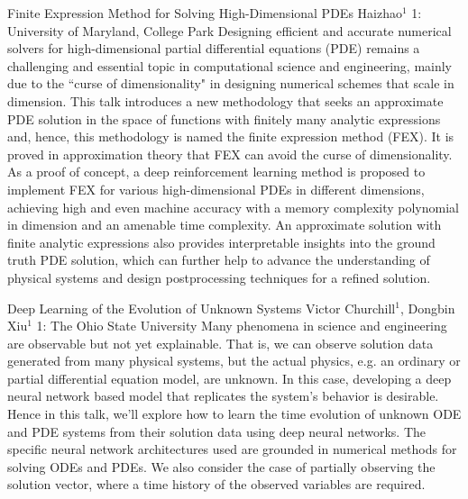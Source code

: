 \begin{addmargin}[2em]{0em}
\vspace{2ex}
\abs
{Finite Expression Method for Solving High-Dimensional PDEs}
{Haizhao$^{1}$}
{1: University of Maryland, College Park}
{Designing efficient and accurate numerical solvers for high-dimensional partial differential equations (PDE) remains a challenging and essential topic in computational science and engineering, mainly due to the ``curse of dimensionality" in designing numerical schemes that scale in dimension. This talk introduces a new methodology that seeks an approximate PDE solution in the space of functions with finitely many analytic expressions and, hence, this methodology is named the finite expression method (FEX). It is proved in approximation theory that FEX can avoid the curse of dimensionality. As a proof of concept, a deep reinforcement learning method is proposed to implement FEX for various high-dimensional PDEs in different dimensions, achieving high and even machine accuracy with a memory complexity polynomial in dimension and an amenable time complexity. An approximate solution with finite analytic expressions also provides interpretable insights into the ground truth PDE solution, which can further help to advance the understanding of physical systems and design postprocessing techniques for a refined solution.}


\vspace{1.5ex}
\abs
{Deep Learning of the Evolution of Unknown Systems}
{Victor Churchill$^1$, Dongbin Xiu$^1$}
{1: The Ohio State University}
{Many phenomena in science and engineering are observable but not yet explainable. That is, we can observe solution data generated from many physical systems, but the actual physics, e.g. an ordinary or partial differential equation model, are unknown. In this case, developing a deep neural network based model that replicates the system’s behavior is desirable. Hence in this talk, we’ll explore how to learn the time evolution of unknown ODE and PDE systems from their solution data using deep neural networks. The specific neural network architectures used are grounded in numerical methods for solving ODEs and PDEs. We also consider the case of partially observing the solution vector, where a time history of the observed variables are required.}



\end{addmargin}
